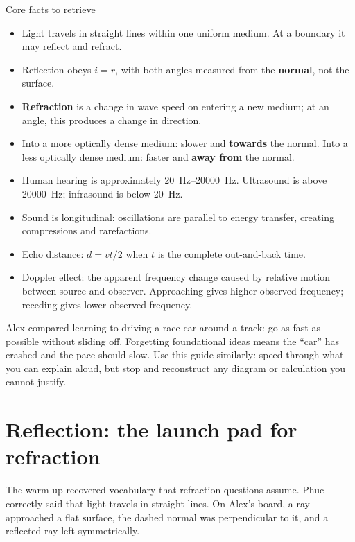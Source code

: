 \documentclass[11pt,a4paper]{article}
\newcommand{\term}[1]{\textbf{#1}}
\begin{document}
\begin{keybox}{Core facts to retrieve}
\begin{itemize}
\item Light travels in straight lines within one uniform medium. At a boundary it may reflect and refract.
\item Reflection obeys $i=r$, with both angles measured from the \term{normal}, not the surface.
\item \term{Refraction} is a change in wave speed on entering a new medium; at an angle, this produces a change in direction.
\item Into a more optically dense medium: slower and \term{towards} the normal. Into a less optically dense medium: faster and \term{away from} the normal.
\item Human hearing is approximately \SIrange{20}{20000}{\hertz}. Ultrasound is above \SI{20000}{\hertz}; infrasound is below \SI{20}{\hertz}.
\item Sound is longitudinal: oscillations are parallel to energy transfer, creating compressions and rarefactions.
\item Echo distance: $d=vt/2$ when $t$ is the complete out-and-back time.
\item Doppler effect: the apparent frequency change caused by relative motion between source and observer. Approaching gives higher observed frequency; receding gives lower observed frequency.
\end{itemize}
\end{keybox}

Alex compared learning to driving a race car around a track: go as fast as possible without sliding off. Forgetting foundational ideas means the ``car'' has crashed and the pace should slow. Use this guide similarly: speed through what you can explain aloud, but stop and reconstruct any diagram or calculation you cannot justify.

\section{Reflection: the launch pad for refraction}
The warm-up recovered vocabulary that refraction questions assume. Phuc correctly said that light travels in straight lines. On Alex's board, a ray approached a flat surface, the dashed normal was perpendicular to it, and a reflected ray left symmetrically.

\begin{center}
\end{center}
\end{document}
